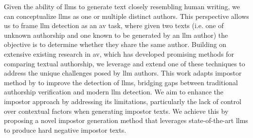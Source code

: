 Given the ability of \acp{llm} to generate text closely resembling human writing, we can conceptualize \acp{llm} as one or multiple distinct authors.
This perspective allows us to frame \ac{llm} detection as an \ac{av} task, where given two texts (i.e. one of unknown authorship and one known to be generated by an \ac{llm} author) the objective is to determine whether they share the same author.
Building on extensive existing research in \ac{av}, which has developed promising methods for comparing textual authorship, we leverage and extend one of these techniques to address the unique challenges posed by \ac{llm} authors. 
This work adapts impostor method by \citet{koppel_determining_2014} to improve the detection of \acp{llm}, bridging gaps between traditional authorship verification and modern \ac{llm} detection.
We aim to enhance the impostor approach by addressing its limitations, particularly the lack of control over contextual factors when generating impostor texts.
We achieve this by proposing a novel impostor generation method that leverages state-of-the-art \acp{llm} to produce hard negative impostor texts.

